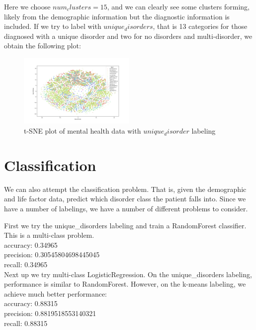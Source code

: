 \documentclass[11pt]{amsart}
\begin{document}
Here we choose $num_clusters=15$, and we can clearly see some clusters forming, likely from the demographic information but the diagnostic information is included. If we try to label with $unique_disorders$, that is 13 categories for those diagnosed with a unique disorder and two for no disorders and multi-disorder, we obtain the following plot:

\begin{figure}[h]
\caption{t-SNE plot of mental health data with $unique_disorder$ labeling}
\centering
\includegraphics[width=0.5\textwidth]{tsne-plot_unique-disorders_label.png}
\end{figure}

\section{Classification}

We can also attempt the classification problem. That is, given the demographic and life factor data, predict which disorder class the patient falls into. Since we have a number of labelings, we have a number of different problems to consider. 

First we try the unique\_disorders labeling and train a RandomForest classifier. This is a multi-class problem. \\

\noindent accuracy: 0.34965 \\
precision: 0.30545804698445045 \\
recall: 0.34965 \\

Next up we try multi-class LogisticRegression. On the unique\_disorders labeling, performance is similar to RandomForest. However, on the k-means labeling, we achieve much better performance: \\

\noindent accuracy: 0.88315 \\
precision: 0.8819518553140321 \\
recall: 0.88315 \\
\end{document}
